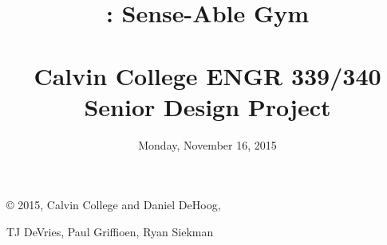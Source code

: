 \documentclass{article}
\title{
\vspace{2in}
\textmd{\textbf{\TeamName: Sense-Able Gym}}\\
\textmd{\textbf\DocTitle}\\
\vspace{0.1in}\large{Calvin College ENGR 339/340 Senior Design Project}
\vspace{3in}
}
\author{\textbf{\DocAuthorName}}
\date{Monday, November 16, 2015} %
\begin{document}
\maketitle{}
\thispagestyle{empty} %



\newpage
\vspace*{\fill}
\centerline{\copyright{} 2015, Calvin College and Daniel DeHoog,}
\centerline{TJ DeVries, Paul Griffioen, Ryan Siekman}
\vspace*{\fill}


\newpage




\newpage
\tableofcontents

\newpage


\newpage


\newpage






















\newpage


\end{document}
